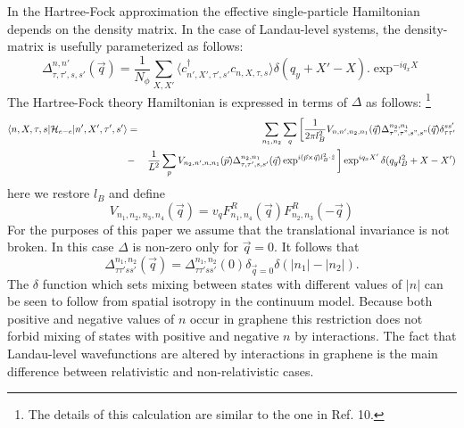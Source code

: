 \documentclass{ws-ijmpb}
\begin{document}
In the Hartree-Fock approximation the effective single-particle Hamiltonian depends on the 
density matrix.  In the case of Landau-level systems, the density-matrix is usefully 
parameterized as follows:
\begin{equation}
\Delta^{n,n'}_{\tau, \tau',s,s'} (\vec{q})= \frac{1}{N_{\phi}} \sum_{X,X'} \langle
c^{\dagger}_{n',X', \tau', s'}c_{n,X, \tau, s} \rangle \delta(q_{y}+X'-X).
\exp^{- iq_{x} X}
\end{equation}
The Hartree-Fock theory Hamiltonian is expressed in terms of $\Delta$ as follows:
\footnote{The details of this calculation 
are similar to the one in Ref. 10.} 
\begin{eqnarray}
\label{finalHFham}
\langle n,X,\tau,s | \mathcal{H}_{e-e} |n',X',\tau',s' \rangle &=& 
\sum_{n_{1},n_{2}} \sum_{q}
\bigg[ \frac{1}{2 \pi l_{B}^{2}} V_{n,n',n_{2},n_{1}} (\vec{q})
\Delta^{n_{2},n_{1}}_{\tau", \tau",s",s"}(\vec{q}) \delta^{ss'}_{\tau \tau'} \\
\nonumber
&-& \frac{1}{L^{2}} \sum_{p} V_{n_{2},n',n,n_{1}} (\vec{p}) 
\Delta^{n_{2},n_{1}}_{\tau, \tau',s,s'}(\vec{q}) \exp^{i (\vec{p} \times 
\vec{q})l_{B}^{2} \cdot \hat{z}} \bigg] 
\exp^{i q_{x} X'}
\delta(q_{y}l_{B}^{2} + X - X')
\end{eqnarray}
here we restore $l_{B} $ and define
\begin{equation}
V_{n_{1},n_{2},n_{3},n_{4}}(\vec{q}) = v_{q}
F^{R}_{n_{1},n_{4}}(\vec{q})F^{R}_{n_{2},n_{3}}(-\vec{q})
\end{equation}
For the purposes of this paper we assume that the translational
invariance is not broken.  In this case $\Delta$ is non-zero only for $\vec{q}=0$.
It follows that 
\begin{equation}
\Delta^{n_{1},n_{2}}_{\tau \tau' s s'}(\vec{q}) =\Delta^{n_{1},n_{2}}_{\tau \tau' s
s'}(0) \delta_{\vec{q}=0} \delta(|n_{1}| - |n_{2}|).
\end{equation}
The $\delta$ function which sets mixing between states with 
different values of $|n|$ can be seen to follow from spatial 
isotropy in the continuum model.  Because both positive and negative 
values of $n$ occur in graphene this restriction does not 
forbid mixing of states with positive and negative $n$ by interactions.
The fact that Landau-level wavefunctions are altered by interactions in 
graphene is the main difference between relativistic and non-relativistic 
cases.
\end{document}
